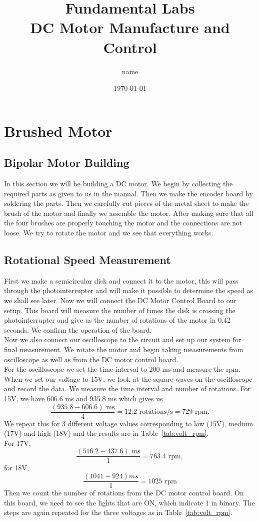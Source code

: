 \documentclass[12pt,a4paper]{report}
\title{Fundamental Labs\\DC Motor Manufacture and Control}
\author{name}
\date{\today}
\begin{document}
\maketitle
\tableofcontents

\chapter{Brushed Motor}
\section{Bipolar Motor Building}
In this section we will be building a DC motor. We begin by collecting the required parts as given to us in the manual.
Then we make the encoder board by soldering the parts. Then we carefully cut pieces of the metal sheet to make the brush of the motor and finally we assemble the motor. After making sure that all the four brushes are properly touching the motor and the connections are not loose. We try to rotate the motor and we see that everything works.
\section{Rotational Speed Measurement}
First we make a semicircular disk and connect it to the motor, this will pass through the photointerrupter and will make it possible to determine the speed as we shall see later.
Now we will connect the DC Motor Control Board to our setup. This board will measure the number of times the disk is crossing the photointerrupter and give us the number of rotations of the motor in 0.42 seconds. We confirm the operation of the board. \\
Now we also connect our oscilloscope to the circuit and set up our system for final measurement. We rotate the motor and begin taking measurements from oscilloscope as well as from the DC motor control board. \\
For the oscilloscope we set the time interval to 200 ms and measure the rpm.
When we set our voltage to 15V, we look at the square waves on the oscilloscope and record the data. We measure the time interval and number of rotations. For 15V, we have 606.6 ms and 935.8 ms which gives us \[\frac{(935.8-606.6)\text{ ms}}{4}=12.2\text{ rotations/s}=729\text{ rpm}.\]
We repeat this for 3 different voltage values corresponding to low (15V), medium (17V) and high (18V) and the results are in 
Table~\ref{tab:volt_rpm}.\\
For 17V, \[\frac{(516.2-437.6)\text{ ms}}{1}=763.4\text{ rpm},\]
for 18V, \begin{equation}\frac{(1041-924)ms}{1} = 1025\text{ rpm}\end{equation}
Then we count the number of rotations from the DC motor control board. On this board, we need to see the lights that are ON, which indicate 1 in binary. The steps are again repeated for the three voltages as in Table~\ref{tab:volt_rpm}. \\
\end{document}
